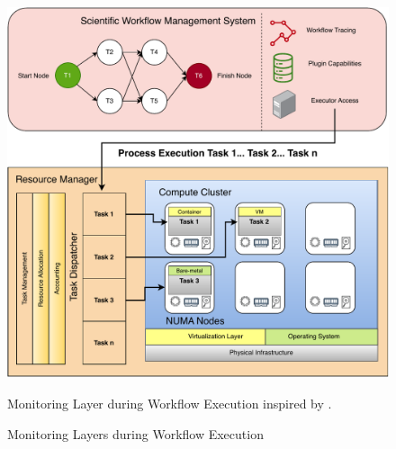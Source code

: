 \begin{figure}[H]
    \centering
    \includegraphics[scale=0.5]{fig/02/02-monitoring-layers2.pdf}
    \caption{Monitoring Layers during Workflow Execution}
    \label{fig:02-monitoring-layers2}
    \tiny
    Monitoring Layer during Workflow Execution inspired by \cite{Bader_2022}.
\end{figure}

